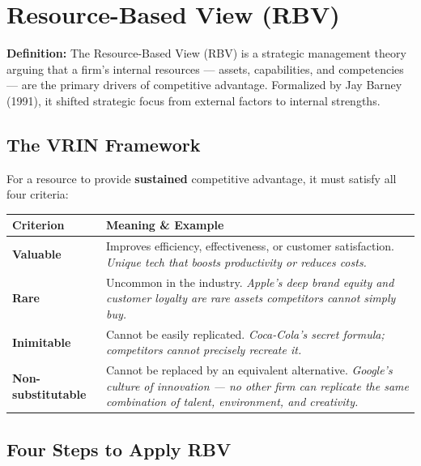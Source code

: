 \documentclass[11pt, letterpaper]{article}
\begin{document}
\newpage

\section{Resource-Based View (RBV)}

\begin{defbox}
\textbf{Definition:} The Resource-Based View (RBV) is a strategic management theory arguing that a firm's internal resources --- assets, capabilities, and competencies --- are the primary drivers of competitive advantage. Formalized by Jay Barney (1991), it shifted strategic focus from external factors to internal strengths.
\end{defbox}

\subsection{The VRIN Framework}

For a resource to provide \textbf{sustained} competitive advantage, it must satisfy all four criteria:

\begin{center}
\begin{tabular}{>{\bfseries}p{3cm} p{9.5cm}}
\toprule
Criterion & Meaning \& Example \\
\midrule
Valuable & Improves efficiency, effectiveness, or customer satisfaction. \textit{Unique tech that boosts productivity or reduces costs.} \\
\addlinespace
Rare & Uncommon in the industry. \textit{Apple's deep brand equity and customer loyalty are rare assets competitors cannot simply buy.} \\
\addlinespace
Inimitable & Cannot be easily replicated. \textit{Coca-Cola's secret formula; competitors cannot precisely recreate it.} \\
\addlinespace
Non-substitutable & Cannot be replaced by an equivalent alternative. \textit{Google's culture of innovation --- no other firm can replicate the same combination of talent, environment, and creativity.} \\
\bottomrule
\end{tabular}
\end{center}

\subsection{Four Steps to Apply RBV}
\end{document}
